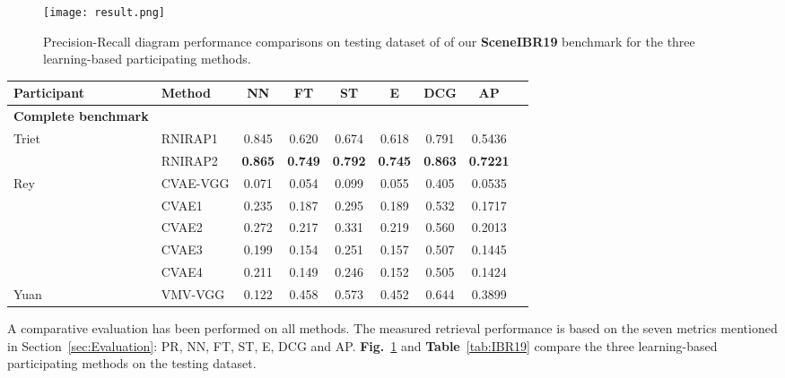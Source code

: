 \documentclass[../main.tex]{subfiles}
\begin{document}
\begin{figure}[!htp]
	\centering
	{
		\texttt{[image: result.png]}
	}
	\caption{ Precision-Recall diagram performance comparisons on testing dataset of of our \textbf{SceneIBR19} benchmark for the three learning-based participating methods.}
	\label{Results}
\end{figure}



\begin{table*}[!htb]
	\centering
	\caption{Performance metrics comparison on the SHREC'19 SceneIBR Track Benchmark.}
	\label{tab:IBR19}
	\begin{tabular}{llccccccc}
		\hline		
		\normalsize {\textbf{Participant}}	&\normalsize {\textbf{Method}} &\normalsize {\textbf{NN}}  &\normalsize {\textbf{FT}} &\normalsize {\textbf{ST}} &\normalsize {\textbf{E}} &\normalsize {\textbf{DCG}} &\normalsize {\textbf{AP}}\\
		\hline
		\textbf{\normalsize{Complete benchmark}}\\
		\hline
		\multirow{2}{*}{Triet} &RNIRAP1 &0.845    &0.620   &0.674   &0.618   
		&0.791  &  0.5436\\	
		\cline{2-8}
		&RNIRAP2 &\textbf{0.865}    &\textbf{0.749}   &\textbf{0.792}   &\textbf{0.745}   &\textbf{0.863} &\textbf{0.7221}\\	
		\hline  		 									
		\multirow{5}{*}{Rey} &CVAE-VGG &0.071    &0.054   &0.099   &0.055   &0.405 &0.0535\\ \cline{2-8}&CVAE1  &0.235    &0.187   &0.295   &0.189   &0.532 &0.1717\\
		\cline{2-8}
		&CVAE2 &0.272    &0.217   &0.331   &0.219   &0.560  &0.2013\\
		\cline{2-8}
		&CVAE3 &0.199    &0.154   &0.251   &0.157   &0.507 &0.1445\\
		\cline{2-8}
		&CVAE4 &0.211    &0.149   &0.246   &0.152   &0.505  &0.1424\\
		\hline							
		Yuan &VMV-VGG &0.122	 &0.458	 &0.573	 &0.452	 &0.644 &0.3899\\			
		\hline		
	\end{tabular}
\end{table*}

A comparative evaluation has been performed on all methods. The measured 
retrieval performance is based on the seven metrics mentioned in 
Section~\ref{sec:Evaluation}: PR, NN, FT, ST, E, DCG and AP. 
\textbf{Fig.}~\ref{Results} and \textbf{Table}~\ref{tab:IBR19} compare the 
three learning-based participating methods on the testing dataset.
\end{document}
